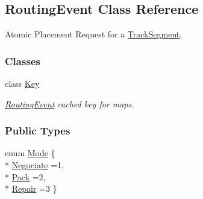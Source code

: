 \hypertarget{classKite_1_1RoutingEvent}{\subsection{Routing\-Event Class Reference}
\label{classKite_1_1RoutingEvent}
}


Atomic Placement Request for a \hyperlink{classKite_1_1TrackSegment}{Track\-Segment}.  


\subsubsection*{Classes}
\begin{DoxyCompactItemize}
\item 
class \hyperlink{classKite_1_1RoutingEvent_1_1Key}{Key}
\begin{DoxyCompactList}\small\item\em \hyperlink{classKite_1_1RoutingEvent}{Routing\-Event} cached key for maps. \end{DoxyCompactList}\end{DoxyCompactItemize}
\subsubsection*{Public Types}
\begin{DoxyCompactItemize}
\item 
enum \hyperlink{classKite_1_1RoutingEvent_a46c8a310cf4c094f8c80e1cb8dc1f911}{Mode} \{ \\*
\hyperlink{classKite_1_1RoutingEvent_a46c8a310cf4c094f8c80e1cb8dc1f911a3980b02882c46c9bd4caf15040b85d1a}{Negociate} =1, 
\\*
\hyperlink{classKite_1_1RoutingEvent_a46c8a310cf4c094f8c80e1cb8dc1f911a5afe185b48d7acf013dd5ccadc5b2414}{Pack} =2, 
\\*
\hyperlink{classKite_1_1RoutingEvent_a46c8a310cf4c094f8c80e1cb8dc1f911a27b403019a93f9f127cf64a0688a8288}{Repair} =3
 \}
\end{DoxyCompactItemize}
